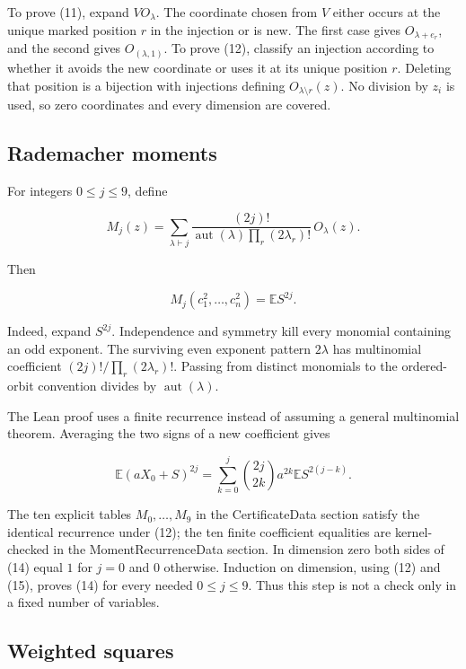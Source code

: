 \documentclass[11pt]{article}
\begin{document}
To prove (11), expand \(V O_\lambda\). The coordinate chosen from \(V\)
either occurs at the unique marked position \(r\) in the injection or is
new. The first case gives \(O_{\lambda+e_r}\), and the second gives
\(O_{(\lambda,1)}\). To prove (12), classify an injection according to
whether it avoids the new coordinate or uses it at its unique position
\(r\). Deleting that position is a bijection with injections defining
\(O_{\lambda\setminus r}(z)\). No division by \(z_i\) is used, so zero
coordinates and every dimension are covered.

\hypertarget{rademacher-moments}{%
\subsection{Rademacher moments}\label{rademacher-moments}}

For integers \(0\le j\le9\), define

\[M_j(z)=\sum_{\lambda\vdash j}
 \frac{(2j)!}{\operatorname{aut}(\lambda)\prod_r(2\lambda_r)!}\,O_\lambda(z). \tag{13}\]

Then

\[M_j(c_1^2,\ldots,c_n^2)=\mathbb E S^{2j}. \tag{14}\]

Indeed, expand \(S^{2j}\). Independence and symmetry kill every monomial
containing an odd exponent. The surviving even exponent pattern
\(2\lambda\) has multinomial coefficient \((2j)!/\prod_r(2\lambda_r)!\).
Passing from distinct monomials to the ordered-orbit convention divides
by \(\operatorname{aut}(\lambda)\).

The Lean proof uses a finite recurrence instead of assuming a general
multinomial theorem. Averaging the two signs of a new coefficient gives

\[\mathbb E(aX_0+S)^{2j}
 =\sum_{k=0}^j\binom{2j}{2k}a^{2k}\mathbb ES^{2(j-k)}. \tag{15}\]

The ten explicit tables \(M_0,\ldots,M_9\) in the CertificateData
section satisfy the identical recurrence under (12); the ten finite
coefficient equalities are kernel-checked in the MomentRecurrenceData
section. In dimension zero both sides of (14) equal \(1\) for \(j=0\)
and \(0\) otherwise. Induction on dimension, using (12) and (15), proves
(14) for every needed \(0\le j\le9\). Thus this step is not a check only
in a fixed number of variables.

\hypertarget{weighted-squares}{%
\subsection{Weighted squares}\label{weighted-squares}}
\end{document}

